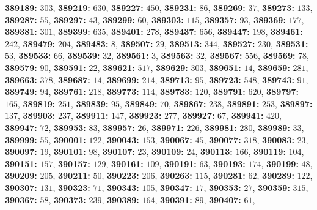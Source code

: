 \textsf{\bfseries 389189:} $303$, \textsf{\bfseries 389219:} $630$, \textsf{\bfseries 389227:} $450$, \textsf{\bfseries 389231:} $86$, \textsf{\bfseries 389269:} $37$, \textsf{\bfseries 389273:} $133$, \textsf{\bfseries 389287:} $55$, \textsf{\bfseries 389297:} $43$, \textsf{\bfseries 389299:} $60$, \textsf{\bfseries 389303:} $115$, \textsf{\bfseries 389357:} $93$, \textsf{\bfseries 389369:} $177$, \textsf{\bfseries 389381:} $301$, \textsf{\bfseries 389399:} $635$, \textsf{\bfseries 389401:} $278$, \textsf{\bfseries 389437:} $656$, \textsf{\bfseries 389447:} $198$, \textsf{\bfseries 389461:} $242$, \textsf{\bfseries 389479:} $204$, \textsf{\bfseries 389483:} $8$, \textsf{\bfseries 389507:} $29$, \textsf{\bfseries 389513:} $344$, \textsf{\bfseries 389527:} $230$, \textsf{\bfseries 389531:} $53$, \textsf{\bfseries 389533:} $66$, \textsf{\bfseries 389539:} $32$, \textsf{\bfseries 389561:} $3$, \textsf{\bfseries 389563:} $32$, \textsf{\bfseries 389567:} $556$, \textsf{\bfseries 389569:} $78$, \textsf{\bfseries 389579:} $90$, \textsf{\bfseries 389591:} $22$, \textsf{\bfseries 389621:} $517$, \textsf{\bfseries 389629:} $303$, \textsf{\bfseries 389651:} $14$, \textsf{\bfseries 389659:} $281$, \textsf{\bfseries 389663:} $378$, \textsf{\bfseries 389687:} $14$, \textsf{\bfseries 389699:} $214$, \textsf{\bfseries 389713:} $95$, \textsf{\bfseries 389723:} $548$, \textsf{\bfseries 389743:} $91$, \textsf{\bfseries 389749:} $94$, \textsf{\bfseries 389761:} $218$, \textsf{\bfseries 389773:} $114$, \textsf{\bfseries 389783:} $120$, \textsf{\bfseries 389791:} $620$, \textsf{\bfseries 389797:} $165$, \textsf{\bfseries 389819:} $251$, \textsf{\bfseries 389839:} $95$, \textsf{\bfseries 389849:} $70$, \textsf{\bfseries 389867:} $238$, \textsf{\bfseries 389891:} $253$, \textsf{\bfseries 389897:} $137$, \textsf{\bfseries 389903:} $237$, \textsf{\bfseries 389911:} $147$, \textsf{\bfseries 389923:} $277$, \textsf{\bfseries 389927:} $67$, \textsf{\bfseries 389941:} $420$, \textsf{\bfseries 389947:} $72$, \textsf{\bfseries 389953:} $83$, \textsf{\bfseries 389957:} $26$, \textsf{\bfseries 389971:} $226$, \textsf{\bfseries 389981:} $280$, \textsf{\bfseries 389989:} $33$, \textsf{\bfseries 389999:} $55$, \textsf{\bfseries 390001:} $122$, \textsf{\bfseries 390043:} $153$, \textsf{\bfseries 390067:} $45$, \textsf{\bfseries 390077:} $318$, \textsf{\bfseries 390083:} $23$, \textsf{\bfseries 390097:} $19$, \textsf{\bfseries 390101:} $98$, \textsf{\bfseries 390107:} $23$, \textsf{\bfseries 390109:} $24$, \textsf{\bfseries 390113:} $166$, \textsf{\bfseries 390119:} $104$, \textsf{\bfseries 390151:} $157$, \textsf{\bfseries 390157:} $129$, \textsf{\bfseries 390161:} $109$, \textsf{\bfseries 390191:} $63$, \textsf{\bfseries 390193:} $174$, \textsf{\bfseries 390199:} $48$, \textsf{\bfseries 390209:} $205$, \textsf{\bfseries 390211:} $50$, \textsf{\bfseries 390223:} $206$, \textsf{\bfseries 390263:} $115$, \textsf{\bfseries 390281:} $62$, \textsf{\bfseries 390289:} $122$, \textsf{\bfseries 390307:} $131$, \textsf{\bfseries 390323:} $71$, \textsf{\bfseries 390343:} $105$, \textsf{\bfseries 390347:} $17$, \textsf{\bfseries 390353:} $27$, \textsf{\bfseries 390359:} $315$, \textsf{\bfseries 390367:} $58$, \textsf{\bfseries 390373:} $239$, \textsf{\bfseries 390389:} $164$, \textsf{\bfseries 390391:} $89$, \textsf{\bfseries 390407:} $61$, 
